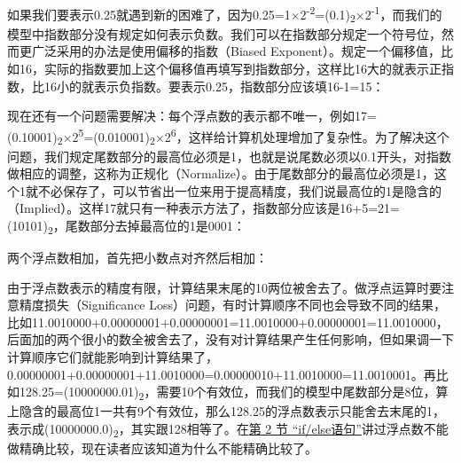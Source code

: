 

如果我们要表示0.\BookSplit{}25就遇到新的困难了，因为0.\BookSplit{}25=\BookSplit{}1×\BookSplit{}2\textsuperscript{-2}=(0.\BookSplit{}1)\textsubscript{2}×2\textsuperscript{-1}，而我们的模型中指数部分没有规定如何表示负数。我们可以在指数部分规定一个符号位，然而更广泛采用的办法是使用偏移的指数（Biased Exponent）。规定一个偏移值，比如16，实际的指数要加上这个偏移值再填写到指数部分，这样比16大的就表示正指数，比16小的就表示负指数。要表示0.\BookSplit{}25，指数部分应该填16-1=\BookSplit{}15：




现在还有一个问题需要解决：每个浮点数的表示都不唯一，例如17=\BookSplit{}(0.\BookSplit{}10001)\textsubscript{2}×2\textsuperscript{5}=(0.\BookSplit{}010001)\textsubscript{2}×2\textsuperscript{6}，这样给计算机处理增加了复杂性。为了解决这个问题，我们规定尾数部分的最高位必须是1，也就是说尾数必须以0.\BookSplit{}1开头，对指数做相应的调整，这称为正规化（Normalize）。由于尾数部分的最高位必须是1，这个1就不必保存了，可以节省出一位来用于提高精度，我们说最高位的1是隐含的（Implied）。这样17就只有一种表示方法了，指数部分应该是16+\BookSplit{}5=\BookSplit{}21=\BookSplit{}(10101)\textsubscript{2}，尾数部分去掉最高位的1是0001：




两个浮点数相加，首先把小数点对齐然后相加：




由于浮点数表示的精度有限，计算结果末尾的10两位被舍去了。做浮点运算时要注意精度损失（Significance Loss）问题，有时计算顺序不同也会导致不同的结果，比如11.\BookSplit{}0010000+\BookSplit{}0.\BookSplit{}00000001+\BookSplit{}0.\BookSplit{}00000001=\BookSplit{}11.\BookSplit{}0010000+\BookSplit{}0.\BookSplit{}00000001=\BookSplit{}11.\BookSplit{}0010000，后面加的两个很小的数全被舍去了，没有对计算结果产生任何影响，但如果调一下计算顺序它们就能影响到计算结果了，0.\BookSplit{}00000001+\BookSplit{}0.\BookSplit{}00000001+\BookSplit{}11.\BookSplit{}0010000=\BookSplit{}0.\BookSplit{}00000010+\BookSplit{}11.\BookSplit{}0010000=\BookSplit{}11.\BookSplit{}0010001。再比如128.\BookSplit{}25=\BookSplit{}(10000000.\BookSplit{}01)\textsubscript{2}，需要10个有效位，而我们的模型中尾数部分是8位，算上隐含的最高位1一共有9个有效位，那么128.\BookSplit{}25的浮点数表示只能舍去末尾的1，表示成(10000000.\BookSplit{}0)\textsubscript{2}，其实跟128相等了。在\hyperlink{db.ch04s02.id2718511}{第 2 节 “if/\BookSplit{}else语句”}讲过浮点数不能做精确比较，现在读者应该知道为什么不能精确比较了。



